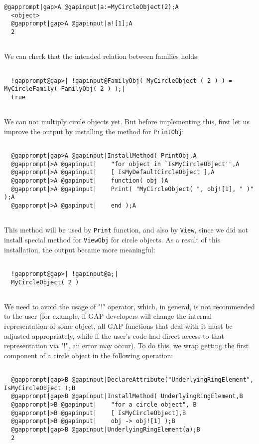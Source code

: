 \documentclass[a4paper,11pt]{report}
\begin{document}
{{\begin{Verbatim}[commandchars=@|A,fontsize=\small,frame=single,label=Example]
  @gapprompt|gap>A @gapinput|a:=MyCircleObject(2);A
  <object>
  @gapprompt|gap>A @gapinput|a![1];A
  2
  
\end{Verbatim}
 We can check that the intended relation between families holds: 

 
\begin{Verbatim}[commandchars=!@|,fontsize=\small,frame=single,label=Example]
  
  !gapprompt@gap>| !gapinput@FamilyObj( MyCircleObject ( 2 ) ) = MyCircleFamily( FamilyObj( 2 ) );|
  true
  
\end{Verbatim}
 We can not multiply circle objects yet. But before implementing this, first
let us improve the output by installing the method for \texttt{PrintObj}: 
\begin{Verbatim}[commandchars=@|A,fontsize=\small,frame=single,label=Example]
  
  @gapprompt|gap>A @gapinput|InstallMethod( PrintObj,A
  @gapprompt|>A @gapinput|    "for object in `IsMyCircleObject'",A
  @gapprompt|>A @gapinput|    [ IsMyDefaultCircleObject ],A
  @gapprompt|>A @gapinput|    function( obj )A
  @gapprompt|>A @gapinput|    Print( "MyCircleObject( ", obj![1], " )" );A
  @gapprompt|>A @gapinput|    end );A
  
\end{Verbatim}
 This method will be used by \texttt{Print} function, and also by \texttt{View}, since we did not install special method for \texttt{ViewObj} for circle objects. As a result of this installation, the output became more
meaningful: 
\begin{Verbatim}[commandchars=!@|,fontsize=\small,frame=single,label=Example]
  
  !gapprompt@gap>| !gapinput@a;|
  MyCircleObject( 2 )
  
\end{Verbatim}
 We need to avoid the usage of "!" operator, which, in general, is not
recommended to the user (for example, if \textsf{GAP} developers will change the internal representation of some object, all \textsf{GAP} functions that deal with it must be adjusted appropriately, while if the
user's code had direct access to that representation via "!", an error may
occur). To do this, we wrap getting the first component of a circle object in
the following operation: 
\begin{Verbatim}[commandchars=@|B,fontsize=\small,frame=single,label=Example]
  
  @gapprompt|gap>B @gapinput|DeclareAttribute("UnderlyingRingElement", IsMyCircleObject );B
  @gapprompt|gap>B @gapinput|InstallMethod( UnderlyingRingElement,B
  @gapprompt|>B @gapinput|    "for a circle object", B
  @gapprompt|>B @gapinput|    [ IsMyCircleObject],B
  @gapprompt|>B @gapinput|    obj -> obj![1] );B
  @gapprompt|gap>B @gapinput|UnderlyingRingElement(a);B
  2
  

\end{Verbatim}}}
\end{document}
